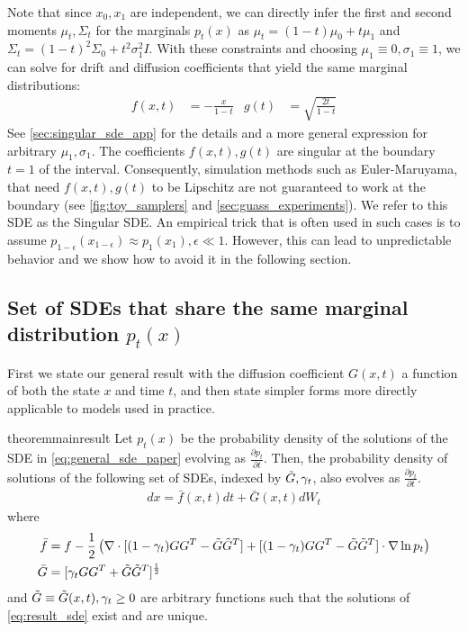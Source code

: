Note that since $x_0, x_1$ are independent, we can directly infer the first and second moments $\mu_t, \Sigma_t$ for the marginals $p_t(x)$ as $\mu_t =  (1-t)\mu_0 + t\mu_1$ and $\Sigma_t = (1-t)^2\Sigma_0 + t^2\sigma_1^2I$.
With these constraints and choosing $\mu_1 \equiv 0, \sigma_1 \equiv 1$, we can solve for drift and diffusion coefficients that yield the same marginal distributions:
\begin{align}
\label{eq:singular_choices}
f(x, t) &= -\frac{x}{1-t} & g(t) &= \sqrt{\frac{2t}{1-t}}
\end{align}
See \cref{sec:singular_sde_app} for the details and a more general expression for arbitrary $\mu_1, \sigma_1$.
The coefficients $f(x, t), g(t)$ are singular at the boundary $t=1$ of the interval.
Consequently, simulation methods such as Euler-Maruyama, that need $f(x, t), g(t)$ to be Lipschitz are not guaranteed to work at the boundary (see \cref{fig:toy_samplers} and \cref{sec:guass_experiments}).
We refer to this SDE as the Singular SDE.
An empirical trick that is often used in such cases is to assume $p_{1-\epsilon}(x_{1-\epsilon}) \approx p_1(x_1),  \epsilon \ll 1$.
However, this can lead to unpredictable behavior and we show how to avoid it in the following section.

\subsection{Set of SDEs that share the same marginal distribution $p_t(x)$}
\label{sec:general_sde}

First we state our general result with the diffusion coefficient $G(x, t)$ a function of both the state $x$ and time $t$, and then state simpler forms more directly applicable to models used in practice.

\begin{restatable}{theorem}{mainresult}
\label{thm:general}
Let $p_t(x)$ be the probability density of the solutions of the SDE in \cref{eq:general_sde_paper}
evolving as $\frac{\partial p_t}{\partial t}$.
Then, the probability density of solutions of the following set of SDEs, indexed by $\tilde G, \gamma_t$, also evolves as $\frac{\partial p_t}{\partial t}$.
\begin{align}
\label{eq:result_sde}
dx = \bar f(x,t)dt + \bar G(x, t)dW_t
\end{align}
where
\begin{align}
\bar f &= f - \frac{1}{2}\left(\nabla \cdot [(1-\gamma_t)GG^T-\tilde G\tilde G^T] + [(1-\gamma_t)GG^T-\tilde G\tilde G^T]\cdot\nabla\ln p_t \right)\\
\bar G &= [\gamma_t GG^T + \tilde G\tilde G^T]^{\frac{1}{2}}
\end{align}
and $\tilde G \equiv \tilde G(x, t), \gamma_t \ge 0$ are arbitrary functions such that the solutions of \cref{eq:result_sde} exist and are unique.
\end{restatable}

